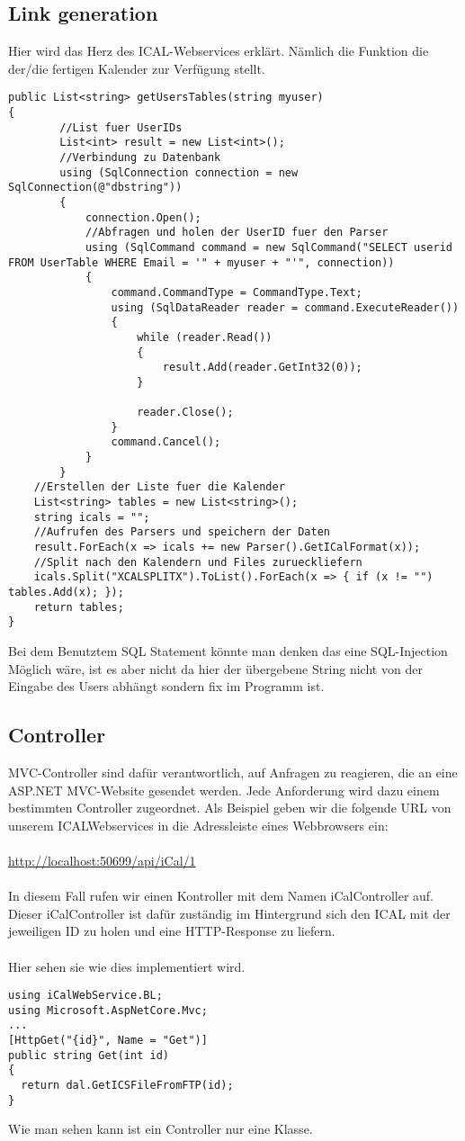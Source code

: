 {\subsection{Link generation}
\label{sec:link}
Hier wird das Herz des ICAL-Webservices erklärt. Nämlich die Funktion die der/die fertigen Kalender zur Verfügung stellt.
\begin{lstlisting}
public List<string> getUsersTables(string myuser)
{
        //List fuer UserIDs
        List<int> result = new List<int>();
        //Verbindung zu Datenbank
        using (SqlConnection connection = new SqlConnection(@"dbstring"))
        {
            connection.Open();
            //Abfragen und holen der UserID fuer den Parser
            using (SqlCommand command = new SqlCommand("SELECT userid FROM UserTable WHERE Email = '" + myuser + "'", connection))
            {
                command.CommandType = CommandType.Text;
                using (SqlDataReader reader = command.ExecuteReader())
                {
                    while (reader.Read())
                    {
                        result.Add(reader.GetInt32(0));
                    }

                    reader.Close();
                }
                command.Cancel();
            }
        }
    //Erstellen der Liste fuer die Kalender
    List<string> tables = new List<string>();
    string icals = "";
    //Aufrufen des Parsers und speichern der Daten
    result.ForEach(x => icals += new Parser().GetICalFormat(x));
    //Split nach den Kalendern und Files zurueckliefern
    icals.Split("XCALSPLITX").ToList().ForEach(x => { if (x != "") tables.Add(x); });
    return tables;
}
\end{lstlisting}
Bei dem Benutztem SQL Statement könnte man denken das eine SQL-Injection Möglich wäre, ist es aber nicht da hier der übergebene String nicht von der Eingabe des Users abhängt sondern fix im Programm ist.
\subsection{Controller}
\label{sec:Controller}
MVC-Controller sind dafür verantwortlich, auf Anfragen zu reagieren, die an eine ASP.NET MVC-Website gesendet werden. Jede Anforderung wird dazu einem bestimmten Controller zugeordnet. Als Beispiel geben wir die folgende URL von unserem ICALWebservices in die Adressleiste eines Webbrowsers ein:\\ \\ 
\url{http://localhost:50699/api/iCal/1} \\ \\
In diesem Fall rufen wir einen Kontroller mit dem Namen iCalController auf. Dieser iCalController ist dafür zuständig im Hintergrund sich den ICAL mit der jeweiligen ID zu holen und eine HTTP-Response zu liefern.\\ \\ Hier sehen sie wie dies implementiert wird.
\begin{lstlisting}
using iCalWebService.BL;
using Microsoft.AspNetCore.Mvc;
...
[HttpGet("{id}", Name = "Get")]
public string Get(int id)
{
  return dal.GetICSFileFromFTP(id);
}
\end{lstlisting}
Wie man sehen kann ist ein Controller nur eine Klasse. 

}
